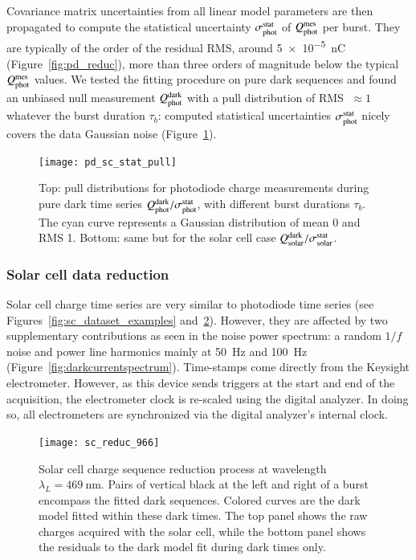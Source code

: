 Covariance matrix uncertainties from all linear model parameters are then propagated to compute the statistical uncertainty $\sigma_{\mathrm{phot}}^{\mathrm{stat}}$ of $Q_{\mathrm{phot}}^{\mathrm{mes}}$ per burst. They are typically of the order of the residual RMS, around \SI{5e-5}{\nano\coulomb} (Figure~\ref{fig:pd_reduc}), more than three orders of magnitude below the typical $Q_{\mathrm{phot}}^{\mathrm{mes}}$ values. We tested the fitting procedure on pure dark sequences and found an unbiased null measurement $Q_{\mathrm{phot}}^{\rm dark}$ with a pull distribution of RMS $\;\approx 1$ whatever the burst duration $\tau_b$: computed statistical uncertainties $\sigma_{\mathrm{phot}}^{\mathrm{stat}}$ nicely covers the data Gaussian noise (Figure~\ref{fig:charge_pull}).

\begin{figure}[!h]
\centering
\texttt{[image: pd\_sc\_stat\_pull]}
\caption{Top: pull distributions for photodiode charge measurements during pure dark time series $Q_{\mathrm{phot}}^{\rm dark} / \sigma_{\mathrm{phot}}^{\mathrm{stat}}$, with different burst durations $\tau_b$. The cyan curve represents a Gaussian distribution of mean 0 and RMS 1. Bottom: same but for the solar cell case $Q_{\mathrm{solar}}^{\rm dark} / \sigma_{\mathrm{solar}}^{\mathrm{stat}}$.}\label{fig:charge_pull}
\end{figure}



\subsubsection{Solar cell data reduction}
\label{sec:solar_reduction}

Solar cell charge time series are very similar to photodiode time series (see Figures~\ref{fig:sc_dataset_examples} and~\ref{fig:sc_reduc}). However, they are affected by two supplementary contributions as seen in the noise power spectrum: a random $1/f$ noise and power line harmonics mainly at \SI{50}{\hertz} and \SI{100}{\hertz} (Figure~\ref{fig:darkcurrentspectrum}). Time-stamps come directly from the Keysight electrometer. However, as this device sends triggers at the start and end of the acquisition, the electrometer clock is re-scaled using the digital analyzer. In doing so, all electrometers are synchronized via the digital analyzer's internal clock.


\begin{figure}[!h]
\centering
\texttt{[image: sc\_reduc\_966]}
\caption{Solar cell charge sequence reduction process at wavelength $\lambda_L=\SI{469}{\nm}$. Pairs of vertical black at the left and right of a burst encompass the fitted dark sequences. Colored curves are the dark model fitted within these dark times. The top panel shows the raw charges acquired with the solar cell, while the bottom panel shows the residuals to the dark model fit during dark times only.}\label{fig:sc_reduc}
\end{figure}

